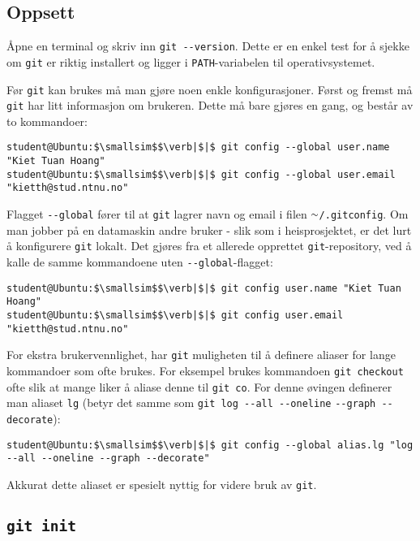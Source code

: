 \begin{alphasection}
\subsection{Oppsett}

Åpne en terminal og skriv inn \verb|git --version|. Dette er en enkel test for å sjekke om \verb|git| er riktig installert og ligger i \verb|PATH|-variabelen til operativsystemet.


Før \verb|git| kan brukes må man gjøre noen enkle konfigurasjoner. Først og fremst må \verb|git| har litt informasjon om brukeren. Dette må bare gjøres en gang, og består av to kommandoer:

\begin{lstlisting}[mathescape=true]
student@Ubuntu:$\smallsim$$\verb|$|$ git config --global user.name "Kiet Tuan Hoang"
student@Ubuntu:$\smallsim$$\verb|$|$ git config --global user.email "kietth@stud.ntnu.no"
\end{lstlisting}


Flagget \verb|--global| fører til at \verb|git| lagrer navn og email i filen \texttt{$\smallsim$/.gitconfig}. Om man jobber på en datamaskin andre bruker - slik som i heisprosjektet, er det lurt å konfigurere \verb|git| lokalt. Det gjøres fra et allerede opprettet \verb|git|-repository, ved å kalle de samme kommandoene uten \verb|--global|-flagget:

\begin{lstlisting}[mathescape=true]
student@Ubuntu:$\smallsim$$\verb|$|$ git config user.name "Kiet Tuan Hoang"
student@Ubuntu:$\smallsim$$\verb|$|$ git config user.email "kietth@stud.ntnu.no"
\end{lstlisting}

For ekstra brukervennlighet, har \verb|git| muligheten til å definere aliaser for lange kommandoer som ofte brukes. For eksempel brukes kommandoen \verb|git checkout| ofte slik at mange liker å aliase denne til \verb|git co|. For denne øvingen definerer man aliaset \verb|lg| (betyr det samme som \verb|git log --all --oneline| \verb|--graph --decorate|):

\begin{lstlisting}[mathescape=true]
student@Ubuntu:$\smallsim$$\verb|$|$ git config --global alias.lg "log --all --oneline --graph --decorate"
\end{lstlisting}

Akkurat dette aliaset er spesielt nyttig for videre bruk av \verb|git|.




\subsection{\texttt{git init}}


\end{alphasection}
